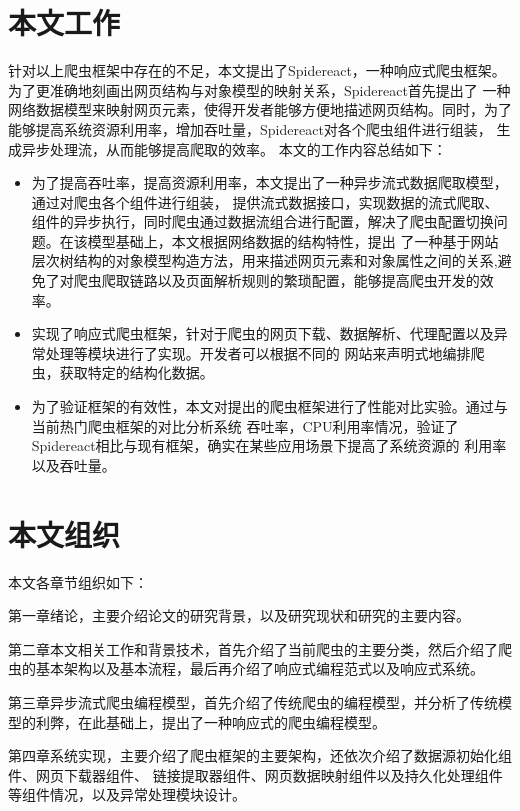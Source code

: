 \documentclass[master]{njuthesis}
\begin{document}
\section{本文工作}
针对以上爬虫框架中存在的不足，本文提出了Spidereact，一种响应式爬虫框架。为了更准确地刻画出网页结构与对象模型的映射关系，Spidereact首先提出了
一种网络数据模型来映射网页元素，使得开发者能够方便地描述网页结构。同时，为了能够提高系统资源利用率，增加吞吐量，Spidereact对各个爬虫组件进行组装，
生成异步处理流，从而能够提高爬取的效率。
本文的工作内容总结如下：
\begin{itemize}
\item 为了提高吞吐率，提高资源利用率，本文提出了一种异步流式数据爬取模型，通过对爬虫各个组件进行组装，
提供流式数据接口，实现数据的流式爬取、组件的异步执行，同时爬虫通过数据流组合进行配置，解决了爬虫配置切换问题。在该模型基础上，本文根据网络数据的结构特性，提出
了一种基于网站层次树结构的对象模型构造方法，用来描述网页元素和对象属性之间的关系,避免了对爬虫爬取链路以及页面解析规则的繁琐配置，能够提高爬虫开发的效率。
\item 实现了响应式爬虫框架，针对于爬虫的网页下载、数据解析、代理配置以及异常处理等模块进行了实现。开发者可以根据不同的
  网站来声明式地编排爬虫，获取特定的结构化数据。
\item 为了验证框架的有效性，本文对提出的爬虫框架进行了性能对比实验。通过与当前热门爬虫框架的对比分析系统
吞吐率，CPU利用率情况，验证了Spidereact相比与现有框架，确实在某些应用场景下提高了系统资源的
利用率以及吞吐量。
\end{itemize}

\section{本文组织}
本文各章节组织如下：

第一章绪论，主要介绍论文的研究背景，以及研究现状和研究的主要内容。

第二章本文相关工作和背景技术，首先介绍了当前爬虫的主要分类，然后介绍了爬虫的基本架构以及基本流程，最后再介绍了响应式编程范式以及响应式系统。

第三章异步流式爬虫编程模型，首先介绍了传统爬虫的编程模型，并分析了传统模型的利弊，在此基础上，提出了一种响应式的爬虫编程模型。

第四章系统实现，主要介绍了爬虫框架的主要架构，还依次介绍了数据源初始化组件、网页下载器组件、
链接提取器组件、网页数据映射组件以及持久化处理组件等组件情况，以及异常处理模块设计。
\end{document}
